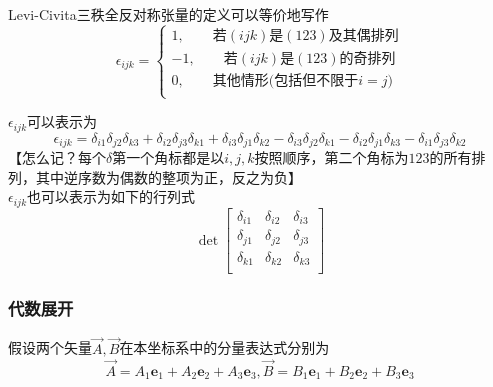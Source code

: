 \documentclass{article}
\newcommand{\ve}{\boldsymbol}
\begin{document}
\begin{CJK}{UTF8}{gkai}
Levi-Civita三秩全反对称张量的定义可以等价地写作\\
\begin{equation*}
    \epsilon_{ijk}=
    \begin{cases}
        1,  \quad\quad \text{若$(ijk)$是$(123)$及其偶排列} \\
        -1, \quad\quad \text{若$(ijk)$是$(123)$的奇排列} \\
        0,  \quad\quad \text{其他情形(包括但不限于$i=j$)} \\
    \end{cases}
\end{equation*}

$\epsilon_{ijk}$可以表示为
\[\epsilon_{ijk}=\delta_{i1}\delta_{j2}\delta_{k3}+\delta_{i2}\delta_{j3}\delta_{k1}+\delta_{i3}\delta_{j1}\delta_{k2}-\delta_{i3}\delta_{j2}\delta_{k1}-\delta_{i2}\delta_{j1}\delta_{k3}-\delta_{i1}\delta_{j3}\delta_{k2}\]
【怎么记？每个$\delta$第一个角标都是以$i,j,k$按照顺序，第二个角标为$123$的所有排列，其中逆序数为偶数的整项为正，反之为负】\\


$\epsilon_{ijk}$也可以表示为如下的行列式
\[\det\begin{bmatrix}
\delta_{i1}&\delta_{i2}&\delta_{i3}\\    
\delta_{j1}&\delta_{j2}&\delta_{j3}\\
\delta_{k1}&\delta_{k2}&\delta_{k3}\\
\end{bmatrix}\]

\subsubsection*{代数展开}
假设两个矢量$\overrightarrow{A},\overrightarrow{B}$在本坐标系中的分量表达式分别为
\[\overrightarrow{A}=A_1\ve{e}_1+A_2\ve{e}_2+A_3\ve{e}_3,\overrightarrow{B}=B_1\ve{e}_1+B_2\ve{e}_2+B_3\ve{e}_3\]


\end{CJK}
\end{document}
